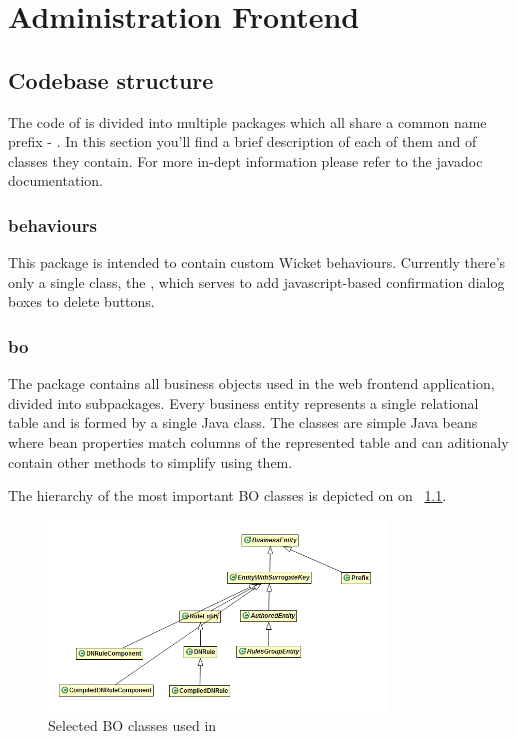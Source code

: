 \chapter{Administration Frontend}

\section{Codebase structure}

The code of \FE is divided into multiple packages which all share a common name prefix - . In this section you'll find a brief description of each of them and of classes they contain. For more in-dept information please refer to the javadoc documentation.

\subsection{behaviours}

This package is intended to contain custom Wicket behaviours. Currently there's only a single class, the , which serves to add javascript-based confirmation dialog boxes to delete buttons.

\subsection{bo}

The  package contains all business objects used in the web frontend application, divided into subpackages. Every business entity represents a single relational table and is formed by a single Java class. The classes are simple Java beans where bean properties match columns of the represented table and can aditionaly contain other methods to simplify using them.

The hierarchy of the most important BO classes is depicted on on \figurename~\ref{fig:feBO}.

\begin{figure}[htb]
    \centering
    \includegraphics[width=0.8\textwidth]{images/dia-fe-bo.png}
    \caption{Selected BO classes used in \FE}
	\label{fig:feBO}
\end{figure}

